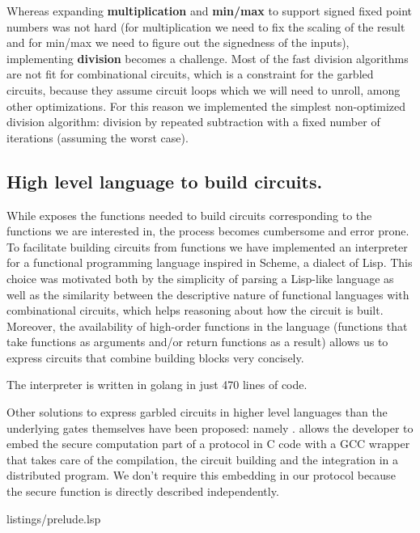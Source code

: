 Whereas expanding \textbf{multiplication} and \textbf{min/max} to support
signed fixed point numbers was not hard (for multiplication we need to fix the
scaling of the result and for min/max we need to figure out the signedness of
the inputs), implementing \textbf{division} becomes a challenge.  Most of the
fast division algorithms are not fit for combinational circuits, which is a
constraint for the garbled circuits, because they assume circuit loops which we
will need to unroll, among other optimizations.  For this reason we implemented
the simplest non-optimized division algorithm: division by repeated subtraction
with a fixed number of iterations (assuming the worst case).

\subsection{High level language to build circuits.}

While \libgarble{} exposes the functions needed to build circuits corresponding
to the functions we are interested in, the process becomes cumbersome and error
prone.  To facilitate building circuits from functions we have implemented an
interpreter for a functional programming language inspired in Scheme, a dialect
of Lisp.  This choice was motivated both by the simplicity of parsing a
Lisp-like language as well as the similarity between the descriptive nature of
functional languages with combinational circuits, which helps reasoning about
how the circuit is built.  Moreover, the availability of high-order functions
in the language (functions that take functions as arguments and/or return
functions as a result) allows us to express circuits that combine building
blocks very concisely.

The interpreter is written in golang in just 470 lines of code.

Other solutions to express garbled circuits in higher level languages than the
underlying gates themselves have been proposed: namely \OblivC{}.  \OblivC{}
allows the developer to embed the secure computation part of a protocol in C
code with a GCC wrapper that takes care of the compilation, the circuit
building and the integration in a distributed program.  We don't require this
embedding in our protocol because the secure function is directly described
independently.


\begin{minipage}{\linewidth}

{listings/prelude.lsp}
\end{minipage}

